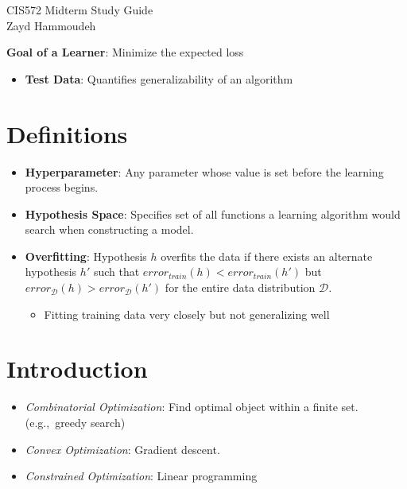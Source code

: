\documentclass[10pt]{article}
\newcommand{\colortext}[2]{{\color{#1} #2}}
\newcommand{\red}[1]{\colortext{red}{#1}}
\begin{document}
\begin{center}
  {\Large CIS572 Midterm Study Guide} \\\vspace{6pt}
  Zayd Hammoudeh
\end{center}


\begin{multicols}{3}
\textbf{Goal of a Learner}: Minimize the \red{expected loss}

\begin{itemize}
  \item \textbf{Test Data}: Quantifies generalizability of an algorithm
\end{itemize}

  \section*{Definitions}

  \begin{itemize}
    \item \textbf{Hyperparameter}: Any parameter whose value is set before the learning process begins.
    \item \textbf{Hypothesis Space}: Specifies set of all functions a learning algorithm would search when constructing a model.
    \item \textbf{Overfitting}: Hypothesis $h$ overfits the data if there exists an alternate hypothesis $h'$ such that $error_{train}(h) < error_{train}(h')$ but $error_{\mathcal{D}}(h) > error_{\mathcal{D}}(h')$ for the entire data distribution $\mathcal{D}$.
     \begin{itemize}
       \item Fitting training data very closely but not generalizing well
     \end{itemize}
  \end{itemize}

  \section{Introduction}

  \begin{itemize}
    \item \textit{Combinatorial Optimization}: Find optimal object within a finite set. (e.g.,~greedy search)
    \item \textit{Convex Optimization}: Gradient descent.
    \item \textit{Constrained Optimization}: Linear programming
  \end{itemize}


\end{multicols}
\end{document}
